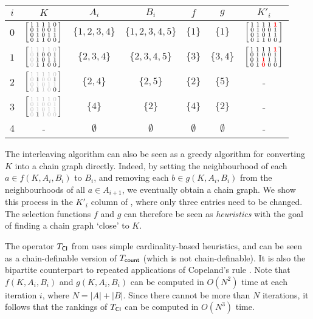 \begin{table}
	\def\es{\emptyset}

	\begin{tabular}{ccccccc}
\toprule
$i$ & $K$        & $A_i$         & $B_i$           & $f$         & $g$       & $K'_i$    \\
\midrule
$0$ & $\left[ \begin{smallmatrix} 1 & 1 & 1 & 1 & 0 \\ 0 & 1 & 0 & 0 & 1 \\ 0 & 1 & 0 & 1 & 1 \\ 0 & 1 & 1 & 0 & 0 \\ \end{smallmatrix} \right]$   & $\{1,2,3,4\}$ & $\{1,2,3,4,5\}$ & $\{1\}$     & $\{1\}$   & $\left[ \begin{smallmatrix} 1 & 1 & 1 & 1 & \bm{{\color{red}1}} \\ 0 & 1 & 0 & 0 & 1 \\ 0 & 1 & 0 & 1 & 1 \\ 0 & 1 & 1 & 0 & 0 \\ \end{smallmatrix} \right]$ \\[2mm]
$1$ & $\kone$    & $\{2,3,4\}$   & $\{2,3,4,5\}$   & $\{3\}$     & $\{3,4\}$ & $\left[ \begin{smallmatrix} 1 & 1 & 1 & 1 & \bm{{\color{red}1}} \\ 0 & 1 & 0 & 0 & 1 \\ 0 & 1 & \bm{{\color{red}1}} & 1 & 1 \\ 0 & 1 & \bm{{\color{red}0}} & 0 & 0 \\ \end{smallmatrix} \right]$  \\[2mm]
$2$ & $\ktwo$    & $\{2,4\}$     & $\{2,5\}$       & $\{2\}$     & $\{5\}$   & -         \\[2mm]
$3$ & $\kthree$  & $\{4\}$       & $\{2\}$         & $\{4\}$     & $\{2\}$   & -         \\[2mm]
$4$ & -          & $\es$         & $\es$    	   & $\es$       & $\es$     & -         \\
\bottomrule
	\end{tabular}
    \label{tourn_tab_cardint_example}
\end{table}

The interleaving algorithm can also be seen as a greedy algorithm for
converting $K$ into a chain graph directly. Indeed, by setting the
neighbourhood of each $a \in f(K, A_i, B_i)$ to $B_i$, and removing each $b \in
g(K, A_i, B_i)$ from the neighbourhoods of all $a \in A_{i+1}$, we eventually
obtain a chain graph. We show this process in the $K'_i$ column of
, where only three entries need to be
changed.\footnotemark{} The selection functions $f$ and $g$ can therefore be
seen as \emph{heuristics} with the goal of finding a chain graph `close' to
$K$.


The operator ${T_{\mathsf{CI}}}$ from  uses simple cardinality-based
heuristics, and can be seen as a chain-definable version of ${T_{\mathsf{count}}}$ (which
is not chain-definable). It is also the bipartite counterpart to repeated
applications of Copeland's rule \cite{bouyssou2004monotonicity}. Note that
$f(K, A_i, B_i)$ and $g(K, A_i, B_i)$ can be computed in $O(N^2)$ time at each
iteration $i$, where $N = |A| + |B|$. Since there cannot be more than $N$
iterations, it follows that the rankings of ${T_{\mathsf{CI}}}$ can be computed in
$O(N^3)$ time.

